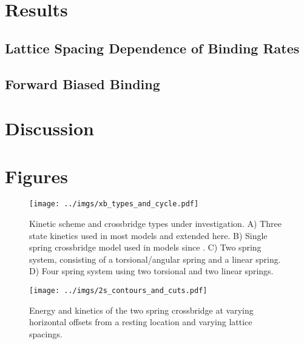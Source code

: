 \documentclass[]{article}
\begin{document}
\section*{Results}

\subsection*{Lattice Spacing Dependence of Binding Rates}



\subsection*{Forward Biased Binding}


\section*{Discussion}

\subsection*{}


\section*{Figures}

\begin{figure}[p]
    \begin{center}
    \texttt{[image: ../imgs/xb\_types\_and\_cycle.pdf]}
    \label{fig:types}
    \caption{
        Kinetic scheme and crossbridge types under investigation. 
        A) Three state kinetics used in most models and extended here. 
        B) Single spring crossbridge model used in models since \cite{Huxley1957e}. 
        C) Two spring system, consisting of a torsional/angular spring and a linear spring. 
        D) Four spring system using two torsional and two linear springs.}
    \end{center}
\end{figure}

\begin{figure}[p]
    \begin{center}
    \texttt{[image: ../imgs/2s\_contours\_and\_cuts.pdf]}
    \label{fig:2s}
    \caption{
        Energy and kinetics of the two spring crossbridge at varying horizontal offsets from a resting location and varying lattice spacings.}
    \end{center}
\end{figure}
\end{document}
